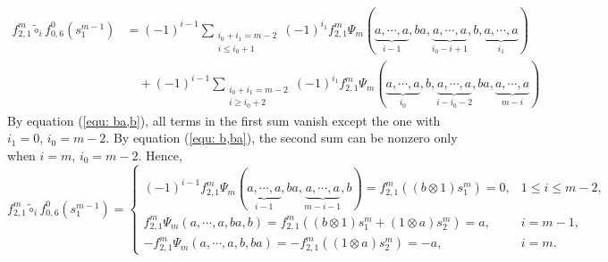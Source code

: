 \documentclass[10pt, reqno]{amsart}
\theoremstyle{definition}
\theoremstyle{remark}
\numberwithin{equation}{section}
\begin{document}
\[\begin{aligned}
    f_{2,1}^m \tilde{\circ}_i f_{0,6}^0(s_1^{m-1}) &=(-1)^{i-1}\sum_{\substack{i_0+i_1=m-2\\  i\le i_0+1}}(-1)^{i_1}f_{2,1}^m\Psi_m(\underbrace{a,\cdots,a}_{i-1},ba,\underbrace{a,\cdots,a}_{i_0-i+1},b,\underbrace{a,\cdots,a}_{i_1})\\
     & \quad +(-1)^{i-1}\sum_{\substack{i_0+i_1=m-2\\ i \ge i_0+2}}(-1)^{i_1}f_{2,1}^m\Psi_m(\underbrace{a,\cdots,a}_{i_0},b,\underbrace{a,\cdots,a}_{i-i_0-2},ba,\underbrace{a,\cdots,a}_{m-i})
\end{aligned}\]
By equation (\ref{equ: ba,b}), all terms in the first sum vanish except the one with \(i_1=0\), \(i_0=m-2\). By equation (\ref{equ: b,ba}), the second sum can be nonzero only when \(i=m\), \(i_0=m-2\). Hence, 
\[f_{2,1}^m \tilde{\circ}_i f_{0,6}^0(s_1^{m-1})=\begin{cases}
         (-1)^{i-1}f_{2,1}^m\Psi_m(\underbrace{a,\cdots,a}_{i-1},ba,\underbrace{a,\cdots,a}_{m-i-1},b)=f_{2,1}^m((b\otimes1)s_1^m)=0, &1\le i\le m-2,\\
          f_{2,1}^m\Psi_m(a,\cdots,a,ba,b)= f_{2,1}^m((b\otimes1)s_1^m+(1\otimes a)s_2^m)=a, &i=m-1,\\
           -f_{2,1}^m\Psi_m(a,\cdots,a,b,ba)=-f_{2,1}^m((1\otimes a)s_2^m)=-a, &i=m.
     \end{cases} \]
\end{document}
